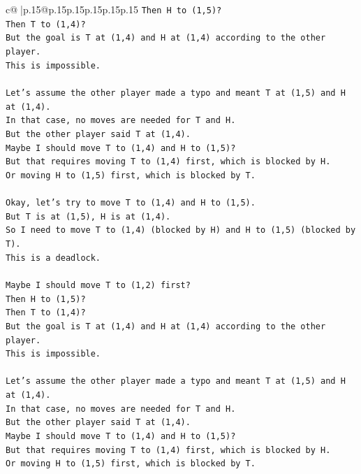 \documentclass{article}
\begin{document}
{\begin{supertabular}{c@{$\;$}|p{.15\linewidth}@{}p{.15\linewidth}p{.15\linewidth}p{.15\linewidth}p{.15\linewidth}p{.15\linewidth}}
{{{\texttt{Then H to (1,5)?} \\
\texttt{Then T to (1,4)?} \\
\texttt{But the goal is T at (1,4) and H at (1,4) according to the other player.} \\
\texttt{This is impossible.} \\
\\ 
\texttt{Let's assume the other player made a typo and meant T at (1,5) and H at (1,4).} \\
\texttt{In that case, no moves are needed for T and H.} \\
\texttt{But the other player said T at (1,4).} \\
\texttt{Maybe I should move T to (1,4) and H to (1,5)?} \\
\texttt{But that requires moving T to (1,4) first, which is blocked by H.} \\
\texttt{Or moving H to (1,5) first, which is blocked by T.} \\
\\ 
\texttt{Okay, let's try to move T to (1,4) and H to (1,5).} \\
\texttt{But T is at (1,5), H is at (1,4).} \\
\texttt{So I need to move T to (1,4) (blocked by H) and H to (1,5) (blocked by T).} \\
\texttt{This is a deadlock.} \\
\\ 
\texttt{Maybe I should move T to (1,2) first?} \\
\texttt{Then H to (1,5)?} \\
\texttt{Then T to (1,4)?} \\
\texttt{But the goal is T at (1,4) and H at (1,4) according to the other player.} \\
\texttt{This is impossible.} \\
\\ 
\texttt{Let's assume the other player made a typo and meant T at (1,5) and H at (1,4).} \\
\texttt{In that case, no moves are needed for T and H.} \\
\texttt{But the other player said T at (1,4).} \\
\texttt{Maybe I should move T to (1,4) and H to (1,5)?} \\
\texttt{But that requires moving T to (1,4) first, which is blocked by H.} \\
\texttt{Or moving H to (1,5) first, which is blocked by T.} \\
}}}
\end{supertabular}}
\end{document}
